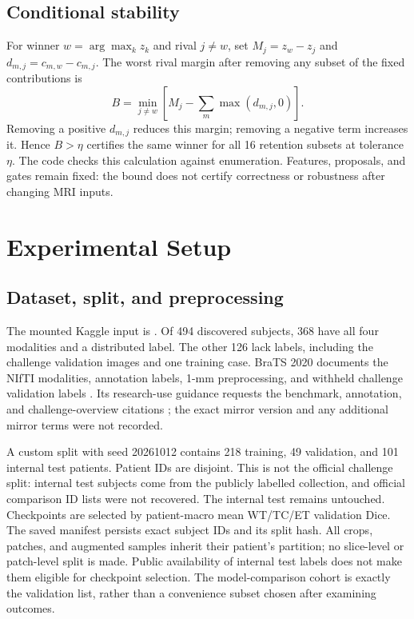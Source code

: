 \documentclass[conference]{IEEEtran}
\begin{document}
\subsection{Conditional stability}
For winner $w=\arg\max_k z_k$ and rival $j\ne w$, set $M_j=z_w-z_j$ and $d_{m,j}=c_{m,w}-c_{m,j}$. The worst rival margin after removing any subset of the fixed contributions is
\begin{equation}
B=\min_{j\ne w}\left[M_j-\sum_m\max(d_{m,j},0)\right].
\label{eq:stability}
\end{equation}
Removing a positive $d_{m,j}$ reduces this margin; removing a negative term increases it. Hence $B>\eta$ certifies the same winner for all 16 retention subsets at tolerance $\eta$. The code checks this calculation against enumeration. Features, proposals, and gates remain fixed: the bound does not certify correctness or robustness after changing MRI inputs.

\section{Experimental Setup}
\subsection{Dataset, split, and preprocessing}
The mounted Kaggle input is . Of 494 discovered subjects, 368 have all four modalities and a distributed label. The other 126 lack labels, including the challenge validation images and one training case. BraTS 2020 documents the NIfTI modalities, annotation labels, 1-mm preprocessing, and withheld challenge validation labels \cite{brats2020data}. Its research-use guidance requests the benchmark, annotation, and challenge-overview citations \cite{menze2015,bakas2017,bakas2018challenge}; the exact mirror version and any additional mirror terms were not recorded.

A custom split with seed 20261012 contains 218 training, 49 validation, and 101 internal test patients. Patient IDs are disjoint. This is not the official challenge split: internal test subjects come from the publicly labelled collection, and official comparison ID lists were not recovered. The internal test remains untouched. Checkpoints are selected by patient-macro mean WT/TC/ET validation Dice. The saved manifest persists exact subject IDs and its split hash. All crops, patches, and augmented samples inherit their patient's partition; no slice-level or patch-level split is made. Public availability of internal test labels does not make them eligible for checkpoint selection. The model-comparison cohort is exactly the validation list, rather than a convenience subset chosen after examining outcomes.
\end{document}
